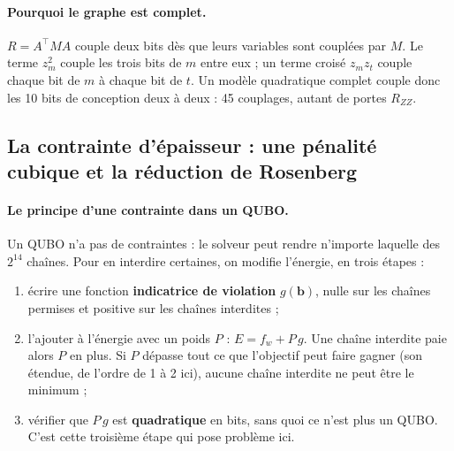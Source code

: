 \paragraph{Pourquoi le graphe est complet.} $R=A^\top MA$ couple deux bits dès que leurs variables sont couplées par $M$. Le terme $z_m^2$ couple les trois bits de $m$ entre eux ; un terme croisé $z_mz_t$ couple chaque bit de $m$ à chaque bit de $t$. Un modèle quadratique complet couple donc les 10 bits de conception deux à deux : 45 couplages, autant de portes $R_{ZZ}$.

\subsection{La contrainte d'épaisseur : une pénalité cubique et la réduction de Rosenberg}\label{sec:rosenberg}

\paragraph{Le principe d'une contrainte dans un QUBO.} Un QUBO n'a pas de contraintes : le solveur peut rendre n'importe laquelle des $2^{14}$ chaînes. Pour en interdire certaines, on modifie l'énergie, en trois étapes :
\begin{enumerate}
\item écrire une fonction \textbf{indicatrice de violation} $g(\mathbf b)$, nulle sur les chaînes permises et positive sur les chaînes interdites ;
\item l'ajouter à l'énergie avec un poids $P$ : $E=f_w+P\,g$. Une chaîne interdite paie alors $P$ en plus. Si $P$ dépasse tout ce que l'objectif peut faire gagner (son étendue, de l'ordre de 1 à 2 ici), aucune chaîne interdite ne peut être le minimum ;
\item vérifier que $P\,g$ est \textbf{quadratique} en bits, sans quoi ce n'est plus un QUBO. C'est cette troisième étape qui pose problème ici.
\end{enumerate}

